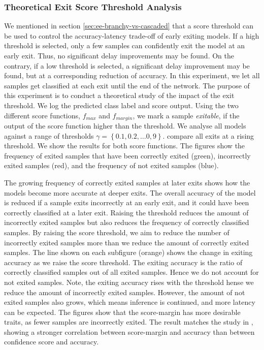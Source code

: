 \subsubsection{Theoretical Exit Score Threshold Analysis}
We mentioned in section \ref{sec:ee-branchy-vs-cascaded} that a score threshold can be used to control the accuracy-latency trade-off of early exiting models. If a high threshold is selected, only a few samples can confidently exit the model at an early exit. Thus, no significant delay improvements may be found. On the contrary, if a low threshold is selected, a significant delay improvement may be found, but at a corresponding reduction of accuracy. 
In this experiment, we let all samples get classified at each exit until the end of the network. The purpose of this experiment is to conduct a theoretical study of the impact of the exit threshold. We log the predicted class label and score output. Using the two different score functions, $ f_{max} $ and $ f_{margin} $, we mark a sample \emph{exitable}, if the output of the score function higher than the threshold. We analyse all models against a range of thresholds $ \gamma = \left\{0.1, 0.2, \dots 0,9\right\} $.
 compare all exits at a rising threshold. We show the results for both score functions.
The figures show the frequency of exited samples that have been correctly exited ({\color{sns-green}green}), incorrectly exited samples ({\color{sns-red}red}), and the frequency of not exited samples ({\color{sns-blue}blue}). 

The growing frequency of correctly exited samples at later exits shows how the models become more accurate at deeper exits. The overall accuracy of the model is reduced if a sample exits incorrectly at an early exit, and it could have been correctly classified at a later exit. Raising the threshold reduces the amount of incorrectly exited samples but also reduces the frequency of correctly classified samples. 
By raising the score threshold, we aim to reduce the number of incorrectly exited samples more than we reduce the amount of correctly exited samples. The line shown on each subfigure ({\color{sns-orange}orange}) shows the change in exiting accuracy as we raise the score threshold. The exiting accuracy is the ratio of correctly classified samples out of all exited samples. Hence we do not account for not exited samples. 
Note, the exiting accuracy rises with the threshold hense we reduce the amount of incorrectly exited samples. However, the amount of not exited samples also grows, which means inference is continued, and more latency can be expected.
The figures show that the score-margin has more desirable traits, as fewer samples are incorrectly exited. The result matches the study in \cite{park_big/little_2015,tann_flexible_2018}, showing a stronger correlation between score-margin and accuracy than between confidence score and accuracy. 

